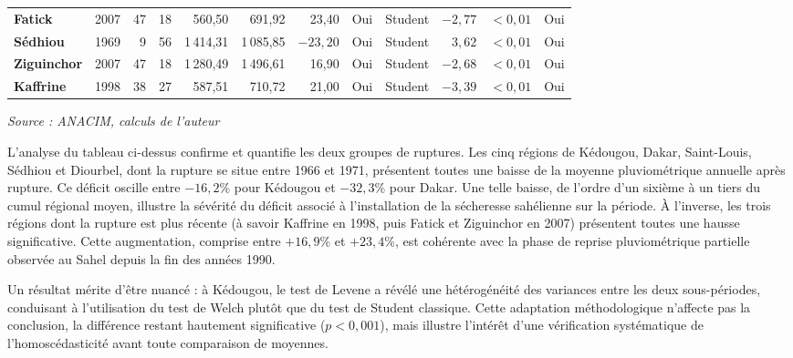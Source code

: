 \documentclass[12pt,a4paper]{report}
\newcommand{\tablesource}{%
  \par\vspace{1pt}%
  {\fontsize{8}{9}\selectfont\itshape Source : ANACIM, calculs de l'auteur\par}%
}
\begin{document}
\begin{table}[H]
\begin{tabular*}{\linewidth}{@{\extracolsep{\fill}}lrrrrrrclrrc@{}}
\rowcolor{navyblue!7}
\textbf{Fatick}      & 2007 & 47 & 18 & 560,50  & 691,92  & 23,40     & Oui & Student & $-2{,}77$ & $<0{,}01$ & Oui \\
\textbf{Sédhiou}     & 1969 &  9 & 56 & 1\,414,31 & 1\,085,85 & $-23{,}20$ & Oui & Student & $3{,}62$  & $<0{,}01$ & Oui \\
\rowcolor{navyblue!7}
\textbf{Ziguinchor}  & 2007 & 47 & 18 & 1\,280,49 & 1\,496,61 & 16,90     & Oui & Student & $-2{,}68$ & $<0{,}01$ & Oui \\
\textbf{Kaffrine}    & 1998 & 38 & 27 & 587,51  & 710,72  & 21,00     & Oui & Student & $-3{,}39$ & $<0{,}01$ & Oui \\
\bottomrule
\end{tabular*}
\endgroup
\tablesource
\end{table}

L'analyse du tableau ci-dessus confirme et quantifie les deux groupes de ruptures. Les cinq régions de Kédougou, Dakar, Saint-Louis, Sédhiou et Diourbel, dont la rupture se situe entre 1966 et 1971, présentent toutes une baisse de la moyenne pluviométrique annuelle après rupture. Ce déficit oscille entre $-16{,}2$\% pour Kédougou et $-32{,}3$\% pour Dakar. Une telle baisse, de l'ordre d'un sixième à un tiers du cumul régional moyen, illustre la sévérité du déficit associé à l'installation de la sécheresse sahélienne sur la période. À l'inverse, les trois régions dont la rupture est plus récente (à savoir Kaffrine en 1998, puis Fatick et Ziguinchor en 2007) présentent toutes une hausse significative. Cette augmentation, comprise entre $+16{,}9$\% et $+23{,}4$\%, est cohérente avec la phase de reprise pluviométrique partielle observée au Sahel depuis la fin des années 1990.

Un résultat mérite d'être nuancé : à Kédougou, le test de Levene a révélé une hétérogénéité des variances entre les deux sous-périodes, conduisant à l'utilisation du test de Welch plutôt que du test de Student classique. Cette adaptation méthodologique n'affecte pas la conclusion, la différence restant hautement significative ($p<0{,}001$), mais illustre l'intérêt d'une vérification systématique de l'homoscédasticité avant toute comparaison de moyennes.
\end{document}
